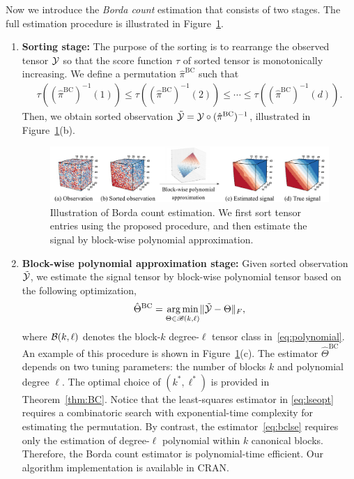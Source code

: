 \documentclass[12pt]{article}
\theoremstyle{definition}
\def\caliB{\mathscr{B}}
\begin{document}
Now we introduce the \emph{Borda count} estimation that consists of two stages. The full estimation procedure is illustrated in Figure~\ref{fig:borda}.
\begin{enumerate}[wide, labelwidth=0pt, labelindent=0pt]
  \item {\bf Sorting stage:} The purpose of the sorting is to rearrange the observed tensor $\mathcal{Y}$ so that the score function $\tau$ of sorted tensor is  monotonically increasing. We define a permutation $\hat\pi^{\text{BC}}$ such that
    \begin{align}\label{eq:permute}
        \tau((\hat\pi^{\text{BC}})^{-1}(1))\leq  \tau((\hat\pi^{\text{BC}})^{-1}(2))
        \leq \cdots 
        \leq
        \tau((\hat\pi^{\text{BC}})^{-1}(d)).
    \end{align}
    Then, we obtain sorted observation $\tilde{\mathcal{Y}} = \mathcal{Y} \circ (\hat\pi^{\text{BC}})^{-1}$, illustrated in Figure~\ref{fig:borda}(b).
\begin{figure}[t]
    \centering
    \includegraphics[width = \textwidth]{figure/Borda2.pdf}
    \caption{Illustration of Borda count estimation. We first sort tensor entries using the proposed procedure, and then estimate the signal by block-wise polynomial approximation.}
    \label{fig:borda}
\end{figure}

 \item {\bf  Block-wise polynomial approximation stage:} Given sorted observation $\tilde {\mathcal{Y}} $, we estimate the signal tensor by block-wise polynomial tensor based on the following optimization,
    \begin{align}\label{eq:bclse}
        \hat\Theta^{\text{BC}} = \argmin_{\Theta\in\caliB(k,\ell)}\FnormSize{}{\tilde\tY-\Theta},
    \end{align}
    where $\mathcal{B}(k,\ell)$ denotes the block-$k$ degree-$\ell$ tensor class  in~\eqref{eq:polynomial}. An example of this procedure is shown in Figure~\ref{fig:borda}(c). The estimator $\hat\Theta^{\text{BC}}$ depends on two tuning parameters: the number of blocks $k$ and polynomial degree $\ell$. The optimal choice of $(k^*,\ell^*)$ is provided in Theorem~\ref{thm:BC}.
    Notice that the least-squares estimator in \eqref{eq:lseopt} requires a combinatoric search with exponential-time complexity for estimating the permutation. By contrast, the estimator~\eqref{eq:bclse} requires only the estimation of degree-$\ell$ polynomial within $k$ canonical blocks. Therefore, the Borda count estimator is polynomial-time efficient. Our algorithm implementation is available in CRAN.
    \end{enumerate}
\end{document}
